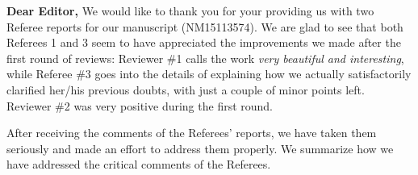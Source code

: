 \documentclass[11pt,a4paper]{article}
\begin{document}




\noindent
{\bf Dear Editor,}
\vskip 0.7cm
We would like to thank you for your providing us with two Referee reports for our manuscript (NM15113574). 
We are glad to see that both Referees 1 and 3 seem to have appreciated the improvements 
we made after the first round of reviews: Reviewer \#1 calls the work \emph{very beautiful and interesting}, while Referee \#3 goes into the details of explaining how we actually satisfactorily clarified her/his previous doubts, with just a couple of minor points left. Reviewer \#2 was very positive during the first round. 

After receiving the comments of the Referees' reports, we have taken them seriously and made an effort to address them properly. 
We summarize how we have addressed the critical comments of the Referees.
\end{document}
